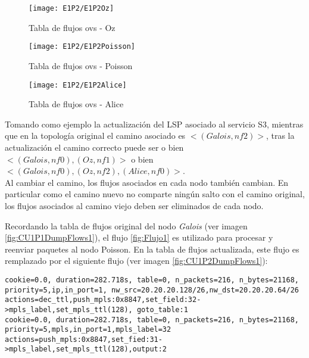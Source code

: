 \begin{figure}[h!] 
\centering    
\texttt{[image: E1P2/E1P2Oz]}
\caption[Tabla de flujos ovs - Oz]{Tabla de flujos ovs - Oz}
\label{fig:CU1P2DumpFlows2}
\end{figure}

\begin{figure}[h!] 
\centering    
\texttt{[image: E1P2/E1P2Poisson]}
\caption[Tabla de flujos ovs - Poisson]{Tabla de flujos ovs - Poisson}
\label{fig:CU1P2DumpFlows3}
\end{figure}

\newpage
\begin{figure}[ht!] 
\centering    
\texttt{[image: E1P2/E1P2Alice]}
\caption[Tabla de flujos ovs - Alice]{Tabla de flujos ovs - Alice}
\label{fig:CU1P2DumpFlows4}
\end{figure}

Tomando como ejemplo la actualizaci\'on del LSP asociado al servicio S3, mientras que en la topolog\'ia original el camino asociado es $<(Galois, nf2)>$, tras la actualizaci\'on el camino correcto puede ser o bien $<(Galois, nf0),(Oz, nf1)>$ o bien \\ $<(Galois, nf0), (Oz, nf2), (Alice, nf0)>$.\\

Al cambiar el camino, los flujos asociados en cada nodo tambi\'en cambian. En particular como el camino nuevo no comparte ning\'un salto con el camino original, los flujos asociados al camino viejo deben ser eliminados de cada nodo.

Recordando la tabla de flujos original del nodo \textit{Galois} (ver imagen \ref{fig:CU1P1DumpFlows1}), el flujo \ref{fig:Flujo1} es utilizado para procesar y reenviar paquetes al nodo Poisson. En la tabla de flujos actualizada, este flujo es remplazado por el siguiente flujo (ver imagen \ref{fig:CU1P2DumpFlows1}):

\begin{center}
\texttt{cookie=0.0, duration=282.718s, table=0, n\_packets=216, n\_bytes=21168, \\
priority=5,ip,in\_port=1, nw\_src=20.20.20.128/26,nw\_dst=20.20.20.64/26 \\
actions=dec\_ttl,push\_mpls:0x8847,set\_field:32->mpls\_label,set\_mpls\_ttl(128), goto\_table:1 \\
\vspace{0.5cm}
cookie=0.0, duration=282.718s, table=0, n\_packets=216, n\_bytes=21168, \\
priority=5,mpls,in\_port=1,mpls\_label=32 \\
actions=push\_mpls:0x8847,set\_fied:31->mpls\_label,set\_mpls\_ttl(128),output:2}
\end{center}


